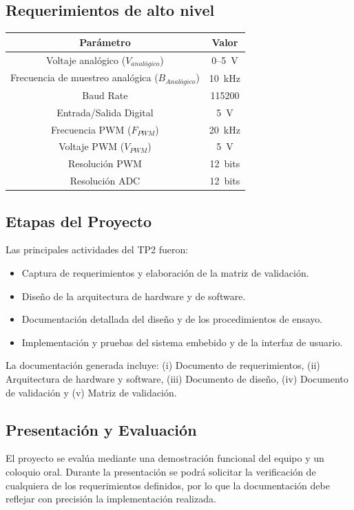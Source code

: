 \documentclass{article}
\begin{document}
\subsection{Requerimientos de alto nivel}
\begin{center}
\begin{tabular}{|c|c|}
\hline
\textbf{Parámetro} & \textbf{Valor} \\ \hline
Voltaje analógico ($V_{analógico}$) & 0--5~V \\ \hline
Frecuencia de muestreo analógica ($B_{Analógico}$) & 10~kHz \\ \hline
Baud Rate & 115200 \\ \hline
Entrada/Salida Digital & 5~V \\ \hline
Frecuencia PWM ($F_{PWM}$) & 20~kHz \\ \hline
Voltaje PWM ($V_{PWM}$) & 5~V \\ \hline
Resolución PWM & 12~bits \\ \hline
Resolución ADC & 12~bits \\ \hline
\end{tabular}
\end{center}

\subsection{Etapas del Proyecto}
Las principales actividades del TP2 fueron:
\begin{itemize}
    \item Captura de requerimientos y elaboración de la matriz de validación.
    \item Diseño de la arquitectura de hardware y de software.
    \item Documentación detallada del diseño y de los procedimientos de ensayo.
    \item Implementación y pruebas del sistema embebido y de la interfaz de usuario.
\end{itemize}

La documentación generada incluye: (i) Documento de requerimientos, (ii) Arquitectura de hardware y software, (iii) Documento de diseño, (iv) Documento de validación y (v) Matriz de validación.

\subsection{Presentación y Evaluación}
El proyecto se evalúa mediante una demostración funcional del equipo y un coloquio oral. Durante la presentación se podrá solicitar la verificación de cualquiera de los requerimientos definidos, por lo que la documentación debe reflejar con precisión la implementación realizada.
\end{document}
